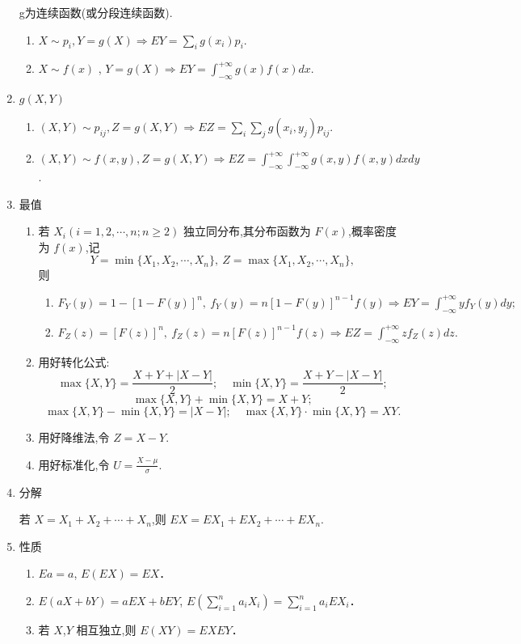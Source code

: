\begin{enumerate}
            g为连续函数(或分段连续函数).
            \begin{enumerate}
                  \item $X\sim p_{i},Y=g(X)\Rightarrow EY=\sum_{i}g(x_{i})p_{i}.$
                  \item $X\sim f( x)$ , $Y= g( X) \Rightarrow EY= \int _{- \infty }^{+ \infty }g( x) f( x)dx$.
            \end{enumerate}
      \item $g(X,Y)$
            \begin{enumerate}
                  \item $( X, Y) \sim p_{ij} , Z= g( X, Y) \Rightarrow EZ= \sum _{i}\sum _{j}g( x_{i}, y_{j}) p_{ij}$.
                  \item $( X, Y) \sim f(x,y) , Z= g( X, Y) \Rightarrow EZ= \int _{- \infty }^{+ \infty }\int _{- \infty }^{+ \infty }g( x, y) f( x, y)dxdy$ .
            \end{enumerate}
      \item 最值
            \begin{enumerate}
                  \item 若 $X_i(i=1,2,\cdots,n;n\geqslant 2)$ 独立同分布,其分布函数为 $F(x)$,概率密度为 $f(x)$,记
                        $$Y = \min\{X_1,X_2,\cdots,X_n\},\ Z = \max\{X_1,X_2,\cdots,X_n\},$$
                        则
                        \begin{enumerate}
                              \item $F_Y(y) = 1 - [1 - F(y)]^n,\ f_Y(y) = n[1 - F(y)]^{n-1}f(y) \Rightarrow EY = \int_{-\infty}^{+\infty} yf_Y(y)dy;$
                              \item $F_Z(z) = [F(z)]^n,\ f_Z(z) = n[F(z)]^{n-1}f(z) \Rightarrow EZ = \int_{-\infty}^{+\infty} zf_Z(z)dz.$
                        \end{enumerate}
                  \item 用好转化公式:
                        $$\max\{X,Y\} = \frac{X+Y+|X-Y|}{2};\quad\min\{X,Y\} = \frac{X+Y-|X-Y|}{2};$$
                        $$\max\{X,Y\} + \min\{X,Y\} = X+Y;$$
                        $$\max\{X,Y\} - \min\{X,Y\} = |X-Y|;\quad\max\{X,Y\} \cdot \min\{X,Y\} = XY.$$
                  \item 用好降维法,令 $Z = X-Y$.
                  \item 用好标准化,令 $U = \frac{X-\mu}{\sigma}$.
            \end{enumerate}
      \item 分解

            若 $X = X_{1} + X_{2} + \cdots + X_{n}$,则 $EX = EX_{1} + EX_{2} + \cdots + EX_{n}$.
      \item 性质
            \begin{enumerate}
                  \item $Ea=a$, $E(EX)=EX$．
                  \item $E(aX+bY)=aEX+bEY$, $E(\sum_{i=1}^{n}a_iX_i)=\sum_{i=1}^{n}a_iEX_i$．
                  \item 若 $X$,$Y$ 相互独立,则 $E(XY)=EXEY$．
            \end{enumerate}
\end{enumerate}
